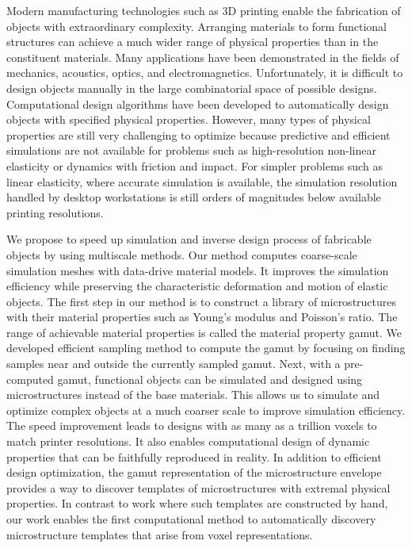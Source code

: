 % 
%
Modern manufacturing technologies such as 3D printing enable the fabrication of objects with extraordinary complexity.
Arranging materials to form functional structures can achieve a much wider range of physical properties than in the constituent materials.
Many applications have been demonstrated in the fields of mechanics, acoustics, optics, and electromagnetics.
Unfortunately, it is difficult to design objects manually in the large combinatorial space of possible designs.
Computational design algorithms have been developed to automatically design objects with specified physical properties.
However, many types of physical properties are still very challenging to optimize because predictive and efficient simulations are not available for 
problems such as high-resolution non-linear elasticity or dynamics with friction and impact.
For simpler problems such as linear elasticity, where accurate simulation is available,
the simulation resolution handled by desktop workstations is still orders of magnitudes below available printing resolutions.

We propose to speed up simulation and inverse design process of fabricable objects by using multiscale methods.
Our method computes coarse-scale simulation meshes with data-drive material models.
It improves the simulation efficiency while preserving the characteristic deformation and motion of elastic objects.
The first step in our method is to construct a library of microstructures with their material properties such as Young's modulus and Poisson's ratio.
The range of achievable material properties is called the material property gamut.
We developed efficient sampling method to compute the gamut by focusing on finding samples near and outside the currently sampled gamut.
Next, with a pre-computed gamut, functional objects can be simulated and designed using microstructures instead of the base materials.
This allows us to simulate and optimize complex objects at a much coarser scale to improve simulation efficiency.
The speed improvement leads to designs with as many as a trillion voxels to match printer resolutions.
It also enables computational design of dynamic properties that can be faithfully reproduced in reality.
In addition to efficient design optimization, 
the gamut representation of the microstructure envelope provides a way to discover templates of microstructures with extremal physical properties.
In contrast to work where such templates are constructed by hand,
our work enables the first computational method to automatically discovery microstructure templates that arise from voxel representations.
